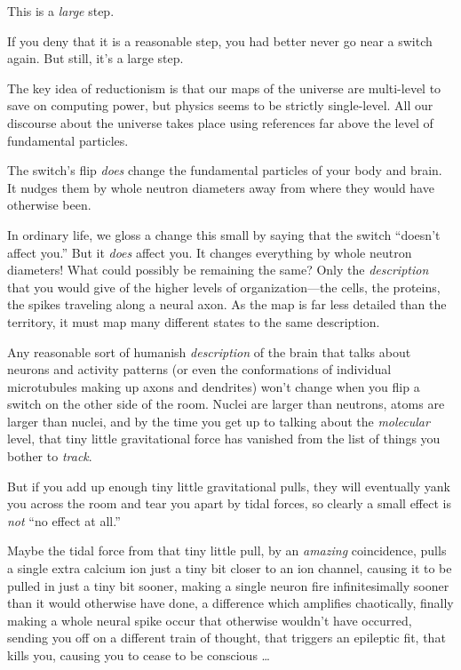 {
 This is a \textit{large} step.}

{
 If you deny that it is a reasonable step, you had better never go
near a switch again. But still, it's a large step.}

{
 The key idea of reductionism is that our maps of the universe are
multi-level to save on computing power, but physics seems to be
strictly single-level. All our discourse about the universe takes place
using references far above the level of fundamental particles.}

{
 The switch's flip \textit{does} change the
fundamental particles of your body and brain. It nudges them by whole
neutron diameters away from where they would have otherwise been.}

{
 In ordinary life, we gloss a change this small by saying that the
switch ``doesn't affect
you.'' But it \textit{does} affect you. It changes
everything by whole neutron diameters! What could possibly be remaining
the same? Only the \textit{description} that you would give of the
higher levels of organization---the cells, the proteins, the spikes
traveling along a neural axon. As the map is far less detailed than the
territory, it must map many different states to the same description.}

{
 Any reasonable sort of humanish \textit{description} of the brain
that talks about neurons and activity patterns (or even the
conformations of individual microtubules making up axons and dendrites)
won't change when you flip a switch on the other side
of the room. Nuclei are larger than neutrons, atoms are larger than
nuclei, and by the time you get up to talking about the
\textit{molecular} level, that tiny little gravitational force has
vanished from the list of things you bother to \textit{track}.}

{
 But if you add up enough tiny little gravitational pulls, they
will eventually yank you across the room and tear you apart by tidal
forces, so clearly a small effect is \textit{not} ``no
effect at all.''}

{
 Maybe the tidal force from that tiny little pull, by an
\textit{amazing} coincidence, pulls a single extra calcium ion just a
tiny bit closer to an ion channel, causing it to be pulled in just a
tiny bit sooner, making a single neuron fire infinitesimally sooner
than it would otherwise have done, a difference which amplifies
chaotically, finally making a whole neural spike occur that otherwise
wouldn't have occurred, sending you off on a different
train of thought, that triggers an epileptic fit, that kills you,
causing you to cease to be conscious \ldots}

